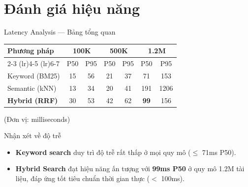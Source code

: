 \section{Đánh giá hiệu năng}

\begin{frame}{Latency Analysis --- Bảng tổng quan}
\centering
\renewcommand{\arraystretch}{1.1}
{\small
\begin{tabular}{l *{6}{c}}
\toprule
\multirow{2}{*}{\textbf{Phương pháp}} & \multicolumn{2}{c}{\textbf{100K}} & \multicolumn{2}{c}{\textbf{500K}} & \multicolumn{2}{c}{\textbf{1.2M}} \\
\cmidrule(lr){2-3} \cmidrule(lr){4-5} \cmidrule(lr){6-7}
& P50 & P95 & P50 & P95 & P50 & P95 \\
\midrule
Keyword (BM25) & 15 & 56 & 21 & 37 & 71 & 153 \\
Semantic (kNN) & 13 & 34 & 20 & 41 & 191 & 1206 \\
\rowcolor{highlightRow}
\textcolor{accentTeal}{\textbf{Hybrid (RRF)}} & \textcolor{accentTeal}{30} & \textcolor{accentTeal}{53} & \textcolor{accentTeal}{42} & \textcolor{accentTeal}{62} & \textcolor{accentTeal}{\textbf{99}} & \textcolor{accentTeal}{156} \\
\bottomrule
\end{tabular}
}

\vspace{0.05cm}
{\scriptsize (Đơn vị: milliseconds)}

\vspace{0.15cm}

\begin{exampleblock}{Nhận xét về độ trễ}
{\small
\begin{itemize}\itemsep0pt \parskip0pt 
    \item \textbf{Keyword search} duy trì độ trễ rất thấp ở mọi quy mô ($\leq$ 71ms P50).
    \item \textbf{Hybrid Search} đạt hiệu năng ấn tượng với \textbf{99ms P50} ở quy mô 1.2M tài liệu, đáp ứng tốt tiêu chuẩn thời gian thực ($<$ 100ms).
\end{itemize}
}
\end{exampleblock}
\end{frame}

